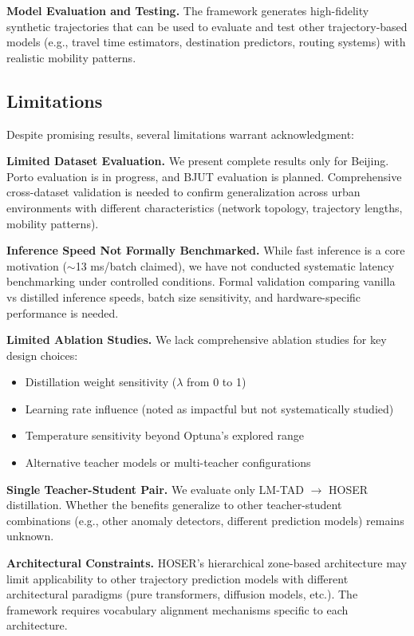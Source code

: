 \textbf{Model Evaluation and Testing.} The framework generates high-fidelity synthetic trajectories that can be used to evaluate and test other trajectory-based models (e.g., travel time estimators, destination predictors, routing systems) with realistic mobility patterns.

\subsection{Limitations}
\label{sec:conclusion-limitations}

Despite promising results, several limitations warrant acknowledgment:

\textbf{Limited Dataset Evaluation.} We present complete results only for Beijing. Porto evaluation is in progress, and BJUT evaluation is planned. Comprehensive cross-dataset validation is needed to confirm generalization across urban environments with different characteristics (network topology, trajectory lengths, mobility patterns).

\textbf{Inference Speed Not Formally Benchmarked.} While fast inference is a core motivation ($\sim$13 ms/batch claimed), we have not conducted systematic latency benchmarking under controlled conditions. Formal validation comparing vanilla vs distilled inference speeds, batch size sensitivity, and hardware-specific performance is needed.

\textbf{Limited Ablation Studies.} We lack comprehensive ablation studies for key design choices:
\begin{itemize}[noitemsep,topsep=0pt]
    \item Distillation weight sensitivity ($\lambda$ from 0 to 1)
    \item Learning rate influence (noted as impactful but not systematically studied)
    \item Temperature sensitivity beyond Optuna's explored range
    \item Alternative teacher models or multi-teacher configurations
\end{itemize}

\textbf{Single Teacher-Student Pair.} We evaluate only LM-TAD $\rightarrow$ HOSER distillation. Whether the benefits generalize to other teacher-student combinations (e.g., other anomaly detectors, different prediction models) remains unknown.

\textbf{Architectural Constraints.} HOSER's hierarchical zone-based architecture may limit applicability to other trajectory prediction models with different architectural paradigms (pure transformers, diffusion models, etc.). The framework requires vocabulary alignment mechanisms specific to each architecture.

